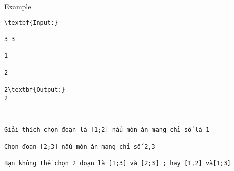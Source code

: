 Example
\begin{verbatim}
\textbf{Input:}

3 3

1

2

2\textbf{Output:}
2\end{verbatim}
\begin{verbatim}


Giải thích chọn đoạn là [1;2] nấu món ăn mang chỉ số là 1

Chọn đoạn [2;3] nấu món ăn mang chỉ số 2,3

Bạn không thể chọn 2 đoạn là [1;3] và [2;3] ; hay [1,2] và[1;3]\end{verbatim}